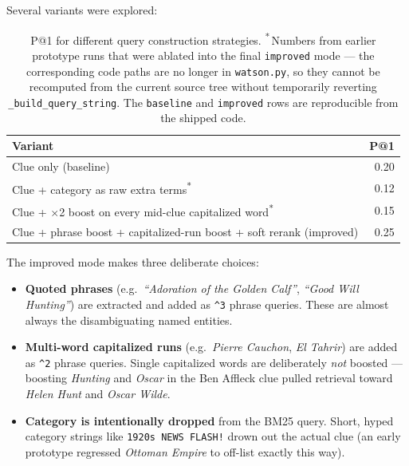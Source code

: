 \documentclass[11pt]{article}
\begin{document}
Several variants were explored:

\begin{table}[h]
\centering
\begin{tabular}{lr}
\toprule
\textbf{Variant} & \textbf{P@1} \\
\midrule
Clue only (baseline)                                         & 0.20 \\
Clue + category as raw extra terms\textsuperscript{*}        & 0.12 \\
Clue + $\times$2 boost on every mid-clue capitalized word\textsuperscript{*}    & 0.15 \\
Clue + phrase boost + capitalized-run boost + soft rerank (improved) & 0.25 \\
\bottomrule
\end{tabular}
\caption{P@1 for different query construction strategies.
\textsuperscript{*}\,Numbers from earlier prototype runs that were
ablated into the final \texttt{improved} mode --- the corresponding
code paths are no longer in \texttt{watson.py}, so they cannot be
recomputed from the current source tree without temporarily reverting
\texttt{\_build\_query\_string}. The \texttt{baseline} and
\texttt{improved} rows are reproducible from the shipped code.}
\end{table}

The improved mode makes three deliberate choices:

\begin{itemize}
  \item \textbf{Quoted phrases} (e.g.\ \emph{``Adoration of the Golden Calf''},
        \emph{``Good Will Hunting''}) are extracted and added as \texttt{\^{}3}
        phrase queries. These are almost always the disambiguating named
        entities.
  \item \textbf{Multi-word capitalized runs} (e.g.\ \emph{Pierre Cauchon},
        \emph{El Tahrir}) are added as \texttt{\^{}2} phrase queries. Single
        capitalized words are deliberately \emph{not} boosted --- boosting
        \emph{Hunting} and \emph{Oscar} in the Ben Affleck clue pulled
        retrieval toward \emph{Helen Hunt} and \emph{Oscar Wilde}.
  \item \textbf{Category is intentionally dropped} from the BM25 query.
        Short, hyped category strings like \texttt{1920s NEWS FLASH!} drown
        out the actual clue (an early prototype regressed \emph{Ottoman Empire}
        to off-list exactly this way).
\end{itemize}
\end{document}
